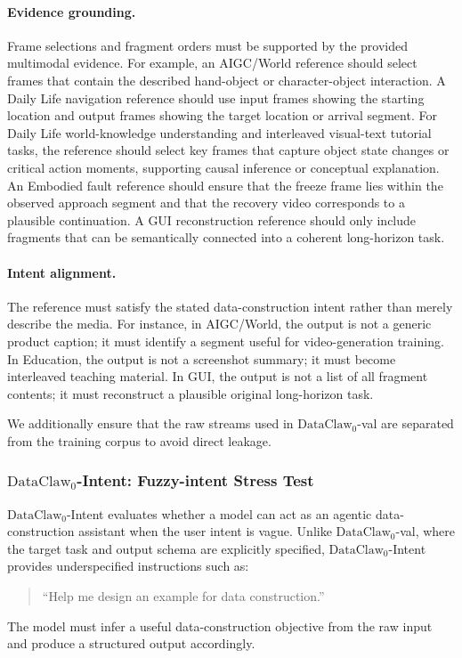\documentclass{llmxive}
\begin{document}
\paragraph{Evidence grounding.}
Frame selections and fragment orders must be supported by the provided multimodal evidence. For example, an AIGC/World reference should select frames that contain the described hand-object or character-object interaction. A Daily Life navigation reference should use input frames showing the starting location and output frames showing the target location or arrival segment. For Daily Life world-knowledge understanding and interleaved visual-text tutorial tasks, the reference should select key frames that capture object state changes or critical action moments, supporting causal inference or conceptual explanation. An Embodied fault reference should ensure that the freeze frame lies within the observed approach segment and that the recovery video corresponds to a plausible continuation. A GUI reconstruction reference should only include fragments that can be semantically connected into a coherent long-horizon task.


\paragraph{Intent alignment.}
The reference must satisfy the stated data-construction intent rather than merely describe the media. For instance, in AIGC/World, the output is not a generic product caption; it must identify a segment useful for video-generation training. In Education, the output is not a screenshot summary; it must become interleaved teaching material. In GUI, the output is not a list of all fragment contents; it must reconstruct a plausible original long-horizon task.

We additionally ensure that the raw streams used in $\text{DataClaw}_0$-val are separated from the training corpus to avoid direct leakage.

\subsubsection{\texorpdfstring{$\text{DataClaw}_0$}{DataClaw0}-Intent: Fuzzy-intent Stress Test}
\label{app:fuzzy_intent}

$\text{DataClaw}_0$-Intent evaluates whether a model can act as an agentic data-construction assistant when the user intent is vague. Unlike $\text{DataClaw}_0$-val, where the target task and output schema are explicitly specified, $\text{DataClaw}_0$-Intent provides underspecified instructions such as:
\begin{quote}
\small
``Help me design an example for data construction.''
\end{quote}
The model must infer a useful data-construction objective from the raw input and produce a structured output accordingly.
\end{document}
